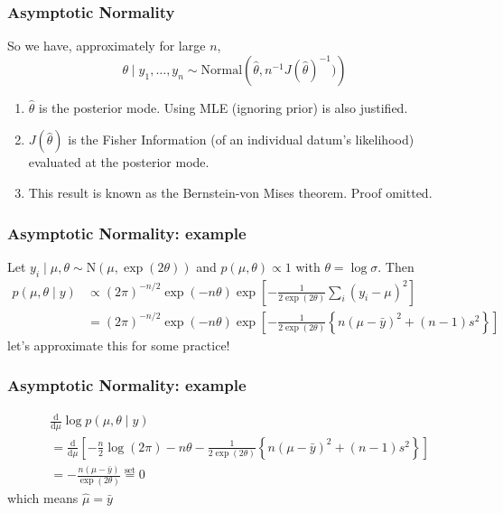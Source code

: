 \documentclass{beamer}
\begin{document}
\begin{frame}
\frametitle{Asymptotic Normality}


So we have, approximately for large $n$,
\[
\theta \mid y_1, \ldots, y_n \sim \text{Normal}\left(\hat{\theta} , n^{-1}J(\hat{\theta})^{-1} )\right)
\]
\begin{enumerate}
\item $\hat{\theta}$ is the posterior mode. Using MLE (ignoring prior) is also justified. 
\item $J(\hat{\theta})$ is the Fisher Information (of an individual datum's likelihood) evaluated at the posterior mode.
\item This result is known as the Bernstein-von Mises theorem. Proof omitted.
\end{enumerate}


\end{frame}

\begin{frame}
\frametitle{Asymptotic Normality: example}

Let $y_i \mid \mu, \theta \sim \text{N}(\mu, \exp(2\theta))$ and $p(\mu, \theta) \propto 1$ with $\theta = \log \sigma$. Then 
\begin{align*}
p(\mu, \theta \mid y) &\propto (2\pi)^{-n/2} \exp(-n\theta) \exp\left[-\frac{1}{2 \exp(2\theta) } \sum_i (y_i - \mu)^2 \right] \\
&= (2\pi)^{-n/2} \exp(-n\theta) \exp\left[-\frac{1}{2 \exp(2\theta) } \left\{ n(\mu - \bar{y})^2 + (n-1)s^2 \right\} \right]
\end{align*}
let's approximate this for some practice!

\end{frame}

\begin{frame}
\frametitle{Asymptotic Normality: example}

\begin{align*}
&\frac{\text{d}}{\text{d} \mu} \log p(\mu, \theta \mid y) \\
&= \frac{\text{d}}{\text{d} \mu}\left[ -\frac{n}{2}\log(2\pi) -n\theta -\frac{1}{2 \exp(2\theta) } \left\{ n(\mu - \bar{y})^2 + (n-1)s^2 \right\} \right] \\
&=  -\frac{n(\mu - \bar{y})}{ \exp(2\theta) }  \overset{\text{set}}{=} 0 
\end{align*}
which means $\hat{\mu} = \bar{y}$

\end{frame}
\end{document}
